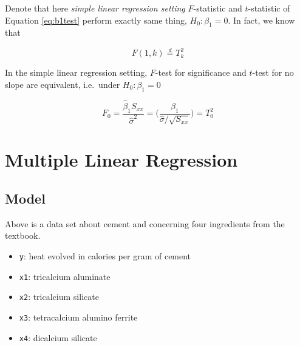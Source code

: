 \documentclass[]{book}
\newenvironment{Shaded}{\begin{snugshade}}{\end{snugshade}}
\newcommand{\CommentTok}[1]{\textcolor[rgb]{0.56,0.35,0.01}{\textit{#1}}}
\newcommand{\KeywordTok}[1]{\textcolor[rgb]{0.13,0.29,0.53}{\textbf{#1}}}
\newcommand{\NormalTok}[1]{#1}
\newcommand{\OperatorTok}[1]{\textcolor[rgb]{0.81,0.36,0.00}{\textbf{#1}}}
\newcommand{\StringTok}[1]{\textcolor[rgb]{0.31,0.60,0.02}{#1}}
\providecommand{\tightlist}{%
  \setlength{\itemsep}{0pt}\setlength{\parskip}{0pt}}
\theoremstyle{definition}
\theoremstyle{definition}
\theoremstyle{definition}
\theoremstyle{remark}
\let\BeginKnitrBlock\begin \let\EndKnitrBlock\end
\begin{document}
Denote that here \emph{simple linear regression setting} \(F\)-statistic and \(t\)-statistic of Equation \eqref{eq:b1test} perform exactly same thing, \(H_0 : \beta_1 = 0\). In fact, we know that

\[F(1, k) \stackrel{d}{=} T_k^2\]

\BeginKnitrBlock{remark}
{}In the simple linear regression setting, \(F\)-test for significance and \(t\)-test for no slope are equivalent, i.e.~under \(H_0 : \beta_1 = 0\)

\[F_0 = \frac{\hat\beta_1 S_{xx}}{\hat\sigma^2} = \bigg( \frac{\hat\beta_1}{\hat\sigma / \sqrt{S_{xx}}} \bigg) = T_0^2\]
\EndKnitrBlock{remark}

\hypertarget{multiple}{%
\chapter{Multiple Linear Regression}\label{multiple}}

\hypertarget{model-1}{%
\section{Model}\label{model-1}}

\begin{Shaded}
\end{Shaded}

Above is a data set about cement and concerning four ingredients from the \citet{Montgomery:2015aa} textbook.

\begin{itemize}
\tightlist
\item
  \texttt{y}: heat evolved in calories per gram of cement
\item
  \texttt{x1}: tricalcium aluminate
\item
  \texttt{x2}: tricalcium silicate
\item
  \texttt{x3}: tetracalcium alumino ferrite
\item
  \texttt{x4}: dicalcium silicate
\end{itemize}
\end{document}
